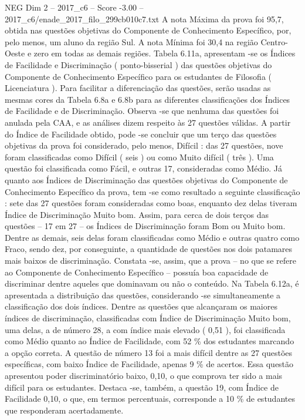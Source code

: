 \begin{textsample}{NEG Dim 2 – 2017\_c6 – Score -3.00 – 2017\_c6/enade\_2017\_filo\_299cb010c7.txt}
A nota Máxima da prova foi 95,7, obtida nas questões objetivas do Componente de Conhecimento Específico, por, pelo menos, um aluno da região Sul.
A nota Mínima foi 30,4 na região Centro-Oeste e zero em todas as demais regiões.
Tabela 6.11a, apresentam -se os Índices de Facilidade e Discriminação ( ponto-bisserial ) das questões objetivas do Componente de Conhecimento Específico para os estudantes de Filosofia ( Licenciatura ).
Para facilitar a diferenciação das questões, serão usadas as mesmas cores da Tabela 6.8a e 6.8b para as diferentes classificações dos Índices de Facilidade e de Discriminação.
Observa -se que nenhuma das questões foi anulada pela CAA, e as análises dizem respeito às 27 questões válidas.
A partir do Índice de Facilidade obtido, pode -se concluir que um terço das questões objetivas da prova foi considerado, pelo menos, Difícil : das 27 questões, nove foram classificadas como Difícil ( seis ) ou como Muito difícil ( três ).
Uma questão foi classificada como Fácil, e outras 17, consideradas como Médio.
Já quanto aos Índices de Discriminação das questões objetivas do Componente de Conhecimento Específico da prova, tem -se como resultado a seguinte classificação : sete das 27 questões foram consideradas como boas, enquanto dez delas tiveram Índice de Discriminação Muito bom.
Assim, para cerca de dois terços das questões – 17 em 27 – os Índices de Discriminação foram Bom ou Muito bom.
Dentre as demais, seis delas foram classificadas como Médio e outras quatro como Fraco, sendo dez, por conseguinte, a quantidade de questões nos dois patamares mais baixos de discriminação.
Constata -se, assim, que a prova – no que se refere ao Componente de Conhecimento Específico – possuía boa capacidade de discriminar dentre aqueles que dominavam ou não o conteúdo.
Na Tabela 6.12a, é apresentada a distribuição das questões, considerando -se simultaneamente a classificação dos dois índices.
Dentre as questões que alcançaram os maiores índices de discriminação, classificadas com Índice de Discriminação Muito bom, uma delas, a de número 28, a com índice mais elevado ( 0,51 ), foi classificada como Médio quanto ao Índice de Facilidade, com 52 \% dos estudantes marcando a opção correta.
A questão de número 13 foi a mais difícil dentre as 27 questões específicas, com baixo Índice de Facilidade, apenas 9 \% de acertos.
Essa questão apresentou poder discriminatório baixo, 0,10, o que comprova ter sido a mais difícil para os estudantes.
Destaca -se, também, a questão 19, com Índice de Facilidade 0,10, o que, em termos percentuais, corresponde a 10 \% de estudantes que responderam acertadamente.

\end{textsample}
